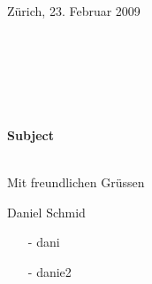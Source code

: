 \documentclass[a4paper,12pt]{letter}
\begin{document}
\thispagestyle{fancy}
\renewcommand{\headrulewidth}{0pt}

\hspace{90mm}Zürich, 23. Februar 2009
\\\par\hspace{88mm}
\usebox{\areturn}\\
\hspace{90mm}\parbox[t][20mm]{50mm}{\hspace{90mm}\fromName \\ \fromStreet \\ \fromPlace \\ \fromTel } 
\vspace{20mm}
\par 
\textbf{Subject} \\\\
\vspace{10mm}
\par\hspace{90mm}Mit freundlichen Grüssen
\par\vspace{15mm}\hspace{90mm}Daniel Schmid
\begin{itemize}
\item [-] dani
\item [-] danie2 
\end{itemize}
\end{document}
